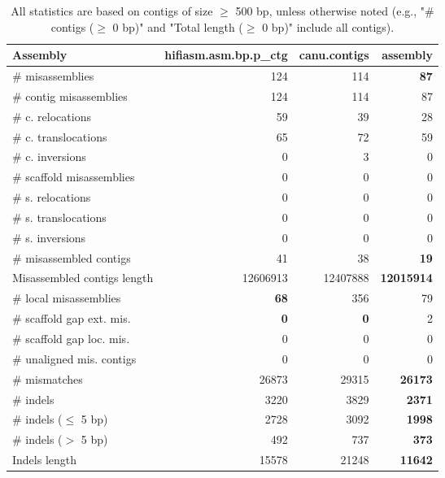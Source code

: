\documentclass[12pt,a4paper]{article}
\begin{document}
\begin{table}[ht]
\begin{center}
\caption{All statistics are based on contigs of size $\geq$ 500 bp, unless otherwise noted (e.g., "\# contigs ($\geq$ 0 bp)" and "Total length ($\geq$ 0 bp)" include all contigs).}
\begin{tabular}{|l*{3}{|r}|}
\hline
Assembly & hifiasm.asm.bp.p\_ctg & canu.contigs & assembly \\ \hline
\# misassemblies & 124 & 114 & {\bf 87} \\ \hline
\hspace{2mm}\# contig misassemblies & 124 & 114 & 87 \\ \hline
\hspace{5mm}\# c. relocations & 59 & 39 & 28 \\ \hline
\hspace{5mm}\# c. translocations & 65 & 72 & 59 \\ \hline
\hspace{5mm}\# c. inversions & 0 & 3 & 0 \\ \hline
\hspace{2mm}\# scaffold misassemblies & 0 & 0 & 0 \\ \hline
\hspace{5mm}\# s. relocations & 0 & 0 & 0 \\ \hline
\hspace{5mm}\# s. translocations & 0 & 0 & 0 \\ \hline
\hspace{5mm}\# s. inversions & 0 & 0 & 0 \\ \hline
\# misassembled contigs & 41 & 38 & {\bf 19} \\ \hline
Misassembled contigs length & 12606913 & 12407888 & {\bf 12015914} \\ \hline
\# local misassemblies & {\bf 68} & 356 & 79 \\ \hline
\# scaffold gap ext. mis. & {\bf 0} & {\bf 0} & 2 \\ \hline
\# scaffold gap loc. mis. & 0 & 0 & 0 \\ \hline
\# unaligned mis. contigs & 0 & 0 & 0 \\ \hline
\# mismatches & 26873 & 29315 & {\bf 26173} \\ \hline
\# indels & 3220 & 3829 & {\bf 2371} \\ \hline
\hspace{5mm}\# indels ($\leq$ 5 bp) & 2728 & 3092 & {\bf 1998} \\ \hline
\hspace{5mm}\# indels ($>$ 5 bp) & 492 & 737 & {\bf 373} \\ \hline
Indels length & 15578 & 21248 & {\bf 11642} \\ \hline
\end{tabular}
\end{center}
\end{table}
\end{document}
